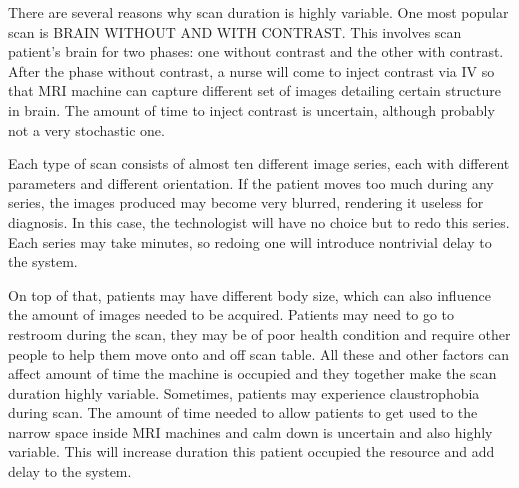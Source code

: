 There are several reasons why scan duration is highly variable. One most popular scan is BRAIN WITHOUT AND WITH CONTRAST. This involves scan patient's brain for two phases: one without contrast and the other with contrast. After the phase without contrast, a nurse will come to inject contrast via IV so that MRI machine can capture different set of images detailing certain structure in brain. The amount of time to inject contrast is uncertain, although probably not a very stochastic one.

Each type of scan consists of almost ten different image series, each with different parameters and different orientation. If the patient moves too much during any series, the images produced may become very blurred, rendering it useless for diagnosis. In this case, the technologist will have no choice but to redo this series. Each series may take minutes, so redoing one will introduce nontrivial delay to the system.

On top of that, patients may have different body size, which can also influence the amount of images needed to be acquired. Patients may need to go to restroom during the scan, they may be of poor health condition and require other people to help them move onto and off scan table. All these and other factors can affect amount of time the machine is occupied and they together make the scan duration highly variable. Sometimes, patients may experience claustrophobia during scan. The amount of time needed to allow patients to get used to the narrow space inside MRI machines and calm down is uncertain and also highly variable. This will increase duration this patient occupied the resource and add delay to the system.
